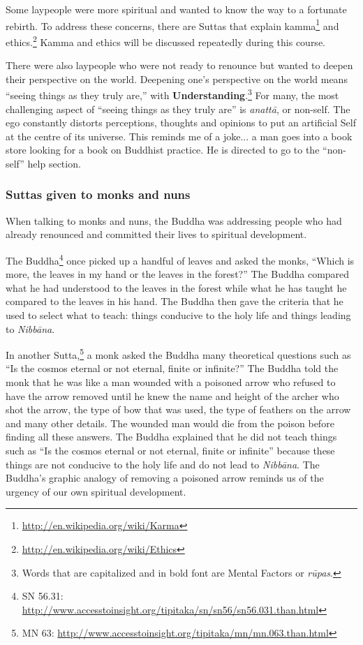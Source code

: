 Some laypeople were more spiritual and wanted to know the way to a fortunate rebirth. To address these concerns, there are Suttas that explain kamma\footnote{\url{http://en.wikipedia.org/wiki/Karma}} and ethics.\footnote{\url{http://en.wikipedia.org/wiki/Ethics}} Kamma and ethics will be discussed repeatedly during this course.

\pagebreak

There were also laypeople who were not ready to renounce but wanted to deepen their perspective on the world. Deepening one’s perspective on the world means “seeing things as they truly are,” with \textbf{Understanding}.\footnote{Words that are capitalized and in bold font are Mental Factors or \textit{rūpas}.} For many, the most challenging aspect of “seeing things as they truly are” is \textit{anattā}, or non-self. The ego constantly distorts perceptions, thoughts and opinions to put an artificial Self at the centre of its universe. This reminds me of a joke... a man goes into a book store looking for a book on Buddhist practice. He is directed to go to the “non-self” help section.

\subsubsection*{Suttas given to monks and nuns}

When talking to monks and nuns, the Buddha was addressing people who had already renounced and committed their lives to spiritual development.

The Buddha\footnote{SN 56.31: \url{http://www.accesstoinsight.org/tipitaka/sn/sn56/sn56.031.than.html}} once picked up a handful of leaves and asked the monks, “Which is more, the leaves in my hand or the leaves in the forest?” The Buddha compared what he had understood to the leaves in the forest while what he has taught he compared to the leaves in his hand. The Buddha then gave the criteria that he used to select what to teach: things conducive to the holy life and things leading to \textit{Nibbāna}.

In another Sutta,\footnote{MN 63: \url{http://www.accesstoinsight.org/tipitaka/mn/mn.063.than.html}} a monk asked the Buddha many theoretical questions such as “Is the cosmos eternal or not eternal, finite or infinite?” The Buddha told the monk that he was like a man wounded with a poisoned arrow who refused to have the arrow removed until he knew the name and height of the archer who shot the arrow, the type of bow that was used, the type of feathers on the arrow and many other details. The wounded man would die from the poison before finding all these answers. The Buddha explained that he did not teach things such as “Is the cosmos eternal or not eternal, finite or infinite” because these things are not conducive to the holy life and do not lead to \textit{Nibbāna}. The Buddha’s graphic analogy of removing a poisoned arrow reminds us of the urgency of our own spiritual development.

